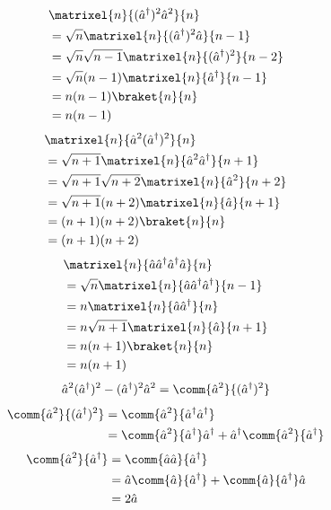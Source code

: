 \begin{align*}
&\matrixel{n}{(\hat{a}^{\dagger})^{2}\hat{a}^{2}}{n}\\
&=\sqrt{n}\matrixel{n}{(\hat{a}^{\dagger})^{2}\hat{a}}{n-1}\\
&=\sqrt{n}\sqrt{n-1}\matrixel{n}{(\hat{a}^{\dagger})^{2}}{n-2}\\
&=\sqrt{n}(n-1)\matrixel{n}{\hat{a}^{\dagger}}{n-1}\\
&=n(n-1)\braket{n}{n}\\
&=n(n-1)
\end{align*}
\begin{align*}
&\matrixel{n}{\hat{a}^{2}(\hat{a}^{\dagger})^{2}}{n}\\
&=\sqrt{n+1}\matrixel{n}{\hat{a}^{2}\hat{a}^{\dagger}}{n+1}\\
&=\sqrt{n+1}\sqrt{n+2}\matrixel{n}{\hat{a}^{2}}{n+2}\\
&=\sqrt{n+1}(n+2)\matrixel{n}{\hat{a}}{n+1}\\
&=(n+1)(n+2)\braket{n}{n}\\
&=(n+1)(n+2)
\end{align*}
\begin{align*}
&\matrixel{n}{\hat{a}\hat{a}^{\dagger}\hat{a}^{\dagger}\hat{a}}{n}\\
&=\sqrt{n}\matrixel{n}{\hat{a}\hat{a}^{\dagger}\hat{a}^{\dagger}}{n-1}\\
&=n\matrixel{n}{\hat{a}\hat{a}^{\dagger}}{n}\\
&=n\sqrt{n+1}\matrixel{n}{\hat{a}}{n+1}\\
&=n(n+1)\braket{n}{n}\\
&=n(n+1)
\end{align*}
\[ \hat{a}^{2}(\hat{a}^{\dagger})^{2}-(\hat{a}^{\dagger})^{2}\hat{a}^{2}=\comm{\hat{a}^{2}}{(\hat{a}^{\dagger})^{2}} \]
\begin{align*}
\comm{\hat{a}^{2}}{(\hat{a}^{\dagger})^{2}}&=\comm{\hat{a}^{2}}{\hat{a}^{\dagger}\hat{a}^{\dagger}}\\
&=\comm{\hat{a}^{2}}{\hat{a}^{\dagger}}\hat{a}^{\dagger}+\hat{a}^{\dagger}\comm{\hat{a}^{2}}{\hat{a}^{\dagger}}
\end{align*}
\begin{align*}
\comm{\hat{a}^{2}}{\hat{a}^{\dagger}}&=\comm{\hat{a}\hat{a}}{\hat{a}^{\dagger}}\\
&=\hat{a}\comm{\hat{a}}{\hat{a}^{\dagger}}+\comm{\hat{a}}{\hat{a}^{\dagger}}\hat{a}\\
&=2\hat{a}
\end{align*}
